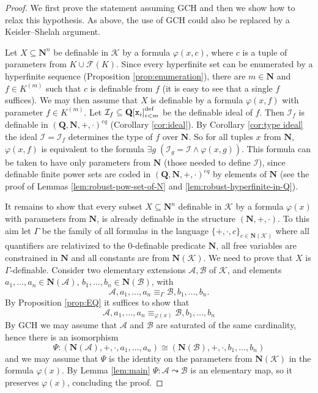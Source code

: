 \documentclass{amsart}
\newcommand{\ca}{\mathcal}
\newcommand{\ideal}[1]{\ca #1}
\theoremstyle{plain}
\theoremstyle{definition}
\newcommand{\F}{\mathcal{F}}
\newcommand{\hn}{\mathbf N}
\newcommand{\hQ}{\mathbf Q}
\newcommand{\pto}{\leadsto} %
\newcommand{\poly}[1]{{\hQ[{\tt x}_i]}_{i<#1}^\text{def}}
\begin{document}
\begin{proof} We first prove the statement assuming GCH and then we show how to relax this hypothesis. As above, the use of GCH could also be replaced by a Keisler--Shelah argument. 

Let $X\subseteq \hn^n$ be definable in $\ca K$ by a formula $\varphi(x, c)$, where $c$ is a tuple of parameters from $K\cup \F(K)$. Since every hyperfinite set can be enumerated by a hyperfinite sequence (Proposition \ref{prop:enumeration}), there are $m\in \hn$ and $f\in K^{(m)}$ such that $c$ is definable from $f$ (it is easy to see that a single $f$ suffices). We may then assume that $X$ is definable by a formula $\varphi(x, f)$ with parameter $f\in K^{(m)}$. Let $\ideal I_f \subseteq \poly m$ be the definable ideal of $f$. Then $\ideal I_f$ is definable in $(\hQ, \hn, +,\cdot)^{eq}$ (Corollary \ref{cor:ideal}). 
By Corollary \ref{cor:type ideal} the ideal $\ideal I = \ideal I_f$ determines the type of $f$ over $\hn$. So for all tuples $x$ from $\hn$, $\varphi (x,f)$ is equivalent to the formula $\exists g \; (\ideal I_g = \ideal I \land \varphi(x,g))$. This formula can be taken to have only parameters from $\hn$ (those needed to define $\ideal I$), since definable finite power sets are coded in $(\hQ,\hn,+,\cdot)^{eq}$ by elements of $\hn$ (see the proof of Lemmas \ref{lem:robust-pow-set-of-N} and \ref{lem:robust-hyperfinite-in-Q}). 

It remains to show that every subset $X \subseteq \hn^n$ definable in $\ca K$ by a formula $\varphi(x)$ with parameters from $\hn$, is already definable in the structure $(\hn, +, \cdot)$. To this aim let $\Gamma$ be the family of all formulas in the language $\{+,\cdot, c\}_{c \in \hn(\ca K)}$ where all quantifiers are relativized to the $0$-definable predicate $\hn$, all free variables are constrained in $\hn$ and all constants are from $\hn (\ca K)$. We need to prove that $X$ is $\Gamma$-definable. 
Consider two elementary extensions $\ca A, \ca B$ of $\ca K$,  and elements $a_1, \ldots, a_n \in \hn(\ca A)$, $b_1, \ldots, b_n\in \hn(\ca B)$, with  
%
$$\ca A, a_1, \ldots, a_n \equiv_{\Gamma} \ca B, b_1, \ldots, b_n.$$
% 
By Proposition \ref{prop:EQ} it suffices to show that 
%
$$\ca A, a_1, \ldots, a_n \equiv_{\varphi(x)} \ca B, b_1, \ldots, b_n$$
%
By GCH we may assume that $\ca A$ and $\ca B$ are saturated of the same cardinality, hence there is an isomorphism
 $$\Psi:(\hn(\ca A),+,\cdot, a_1,\ldots, a_n) \cong (\hn(\ca B),+,\cdot, b_1, \ldots, b_n)$$
 and we may assume that $\Psi$ is the identity on the parameters from $\hn (\ca K)$ in the formula $\varphi(x)$. 
 By Lemma \ref{lem:main} $\Psi:\ca A \pto \ca B$ is an elementary map, so it preserves $\varphi(x)$, concluding the proof. 
 

\end{proof}
\end{document}
